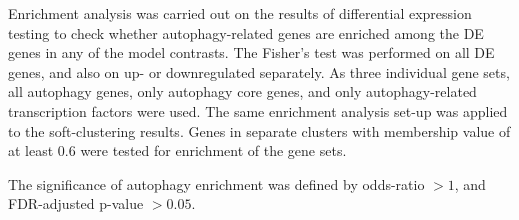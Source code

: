         
        Enrichment analysis was carried out on the results of differential expression testing to check whether autophagy-related genes are enriched among the DE genes in any of the model contrasts. The Fisher's test was performed on all DE genes, and also on up- or downregulated separately. As three individual gene sets, all autophagy genes, only autophagy core genes, and only autophagy-related transcription factors were used. 
        The same enrichment analysis set-up was applied to the soft-clustering results. Genes in separate clusters with membership value of at least $0.6$ were tested for enrichment of the gene sets.

        The significance of autophagy enrichment was defined by odds-ratio 
        $>1$, and FDR-adjusted p-value $>0.05$. 





    
